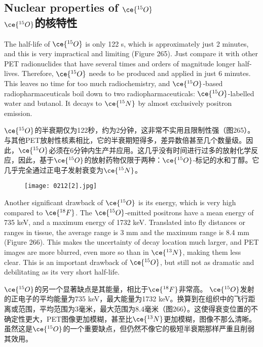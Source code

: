 \documentclass[dvipsnames, svgnames,a4paper,11pt]{article}
\begin{document}
\subsection{Nuclear properties of \(\ce{^{15}O}\)\\ \(\ce{^{15}O}\)的核特性}  
The half-life of \(\ce{^{15}O}\) is only 122 s, which is approximately just 2 minutes, and this is very impractical and limiting (Figure 265). Just compare it with other PET radionuclides that have several times and orders of magnitude longer half-lives. Therefore, \(\ce{^{15}O}\) needs to be produced and applied in just 6 minutes. This leaves no time for too much radiochemistry, and \(\ce{^{15}O}\)-based radiopharmaceuticals boil down to two radiopharmaceuticals: \(\ce{^{15}O}\)-labelled water and butanol. It decays to \(\ce{^{15}N}\) by almost exclusively positron emission.

\(\ce{^{15}O}\)的半衰期仅为122秒，约为2分钟，这非常不实用且限制性强（图265）。与其他PET放射性核素相比，它的半衰期短得多，差异数倍甚至几个数量级。因此，\(\ce{^{15}O}\)必须在6分钟内生产并应用。这几乎没有时间进行过多的放射化学反应，因此，基于\(\ce{^{15}O}\)的放射药物仅限于两种：\(\ce{^{15}O}\)-标记的水和丁醇。它几乎完全通过正电子发射衰变为\(\ce{^{15}N}\)。

\begin{figure}[h]
	\centering
    \texttt{[image: 0212[2].jpg]}  
     \label{fig265}
\end{figure}

Another significant drawback of \(\ce{^{15}O}\) is its energy, which is very high compared to \(\ce{^{18}F}\). The \(\ce{^{15}O}\)-emitted positrons have a mean energy of 735 keV, and a maximum energy of 1732 keV. Translated into fly distances or ranges in tissue, the average range is 3 mm and the maximum range is 8.4 mm (Figure 266). This makes the uncertainty of decay location much larger, and PET images are more blurred, even more so than in \(\ce{^{13}N}\), making them less clear. This is an important drawback of \(\ce{^{15}O}\), but still not as dramatic and debilitating as its very short half-life.

\(\ce{^{15}O}\)的另一个显著缺点是其能量，相比于\(\ce{^{18}F}\)非常高。 \(\ce{^{15}O}\)发射的正电子的平均能量为735 keV，最大能量为1732 keV。换算到在组织中的飞行距离或范围，平均范围为3毫米，最大范围为8.4毫米（图266）。这使得衰变位置的不确定性更大，PET图像更加模糊，甚至比\(\ce{^{13}N}\)更加模糊，图像不那么清晰。虽然这是\(\ce{^{15}O}\)的一个重要缺点，但仍然不像它的极短半衰期那样严重且削弱其效用。
\end{document}
